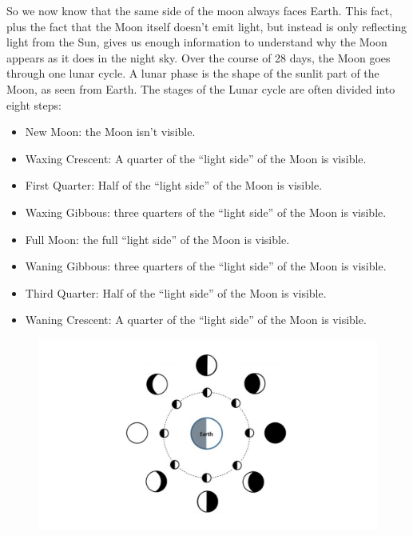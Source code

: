 \documentclass[12pt]{article}%
\begin{document}
So we now know that the same side of the moon always faces Earth. This fact, plus the fact that the Moon itself doesn't emit light, but instead is only reflecting light from the Sun, gives us enough information to understand why the Moon appears as it does in the night sky. Over the course of 28 days, the Moon goes through one lunar cycle. A lunar phase is the shape of the sunlit part of the Moon, as seen from Earth. The stages of the Lunar cycle are often divided into eight steps:
\begin{itemize}
    \item New Moon: the Moon isn't visible.
    
    \item Waxing Crescent: A quarter of the ``light side'' of the Moon is visible.
    
    \item First Quarter: Half of the ``light side'' of the Moon is visible.
    
    \item Waxing Gibbous: three quarters of the ``light side'' of the Moon is visible.
    
    \item Full Moon: the full ``light side'' of the Moon is visible.
    
    \item Waning Gibbous: three quarters of the ``light side'' of the Moon is visible.
    
    \item Third Quarter: Half of the ``light side'' of the Moon is visible.
    
    \item Waning Crescent: A quarter of the ``light side'' of the Moon is visible.
\end{itemize}

\begin{figure}[t]
\center
\includegraphics[width=15cm]{lunar_phases.pdf}
\end{figure}
\end{document}
